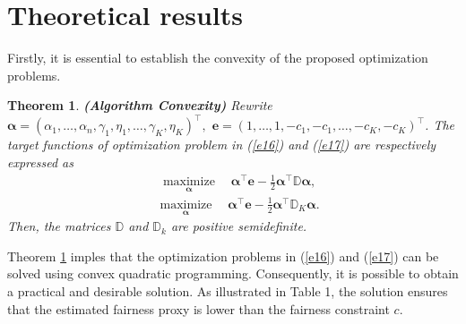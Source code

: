 \documentclass[12pt]{article}
\theoremstyle{plain}
\newtheorem{theorem}{Theorem}[section]
\theoremstyle{definition}
\theoremstyle{remark}
\begin{document}
\section{Theoretical results}
Firstly, it is essential to establish the convexity of the proposed optimization problems.
\begin{theorem}
\label{t1}
\textbf{ \upshape (Algorithm Convexity)}
Rewrite
$\boldsymbol{\alpha}=(\alpha_{1},\ldots,\alpha_n,\gamma_1,\eta_1, \ldots, \gamma_K, \eta_K)^\top,$
$\boldsymbol{e}=(1,\ldots,1,-c_1,-c_1,  \ldots, -c_K, -c_K)^\top$.
The target functions of optimization problem in (\ref{e16}) and  (\ref{e17}) are respectively expressed as
\begin{equation}
\label{e18}
\begin{aligned}
&\underset{\boldsymbol{\alpha}}{\operatorname{maximize}} \quad\boldsymbol{\alpha}^\top\boldsymbol{e}-\frac{1}{2}\boldsymbol{\alpha}^\top\mathbb{D}\boldsymbol{\alpha},
\nonumber
\end{aligned}
\end{equation}
\begin{equation}
\label{e19}
\begin{aligned}
&\underset{\boldsymbol{\alpha}}{\operatorname{maximize}} \quad\boldsymbol{\alpha}^\top\boldsymbol{e}-\frac{1}{2}\boldsymbol{\alpha}^\top\mathbb{D}_K\boldsymbol{\alpha}.
\nonumber
\end{aligned}
\end{equation}
Then, the matrices $\mathbb{D}$ and $\mathbb{D}_k$ are positive semidefinite.
\end{theorem}
Theorem \ref{t1} imples that the optimization problems in (\ref{e16}) and  (\ref{e17}) can be solved using convex quadratic programming. Consequently, it is possible to obtain a practical and desirable solution. As illustrated in Table 1, the solution ensures that the estimated fairness proxy is lower than the fairness constraint $c$.
\end{document}
